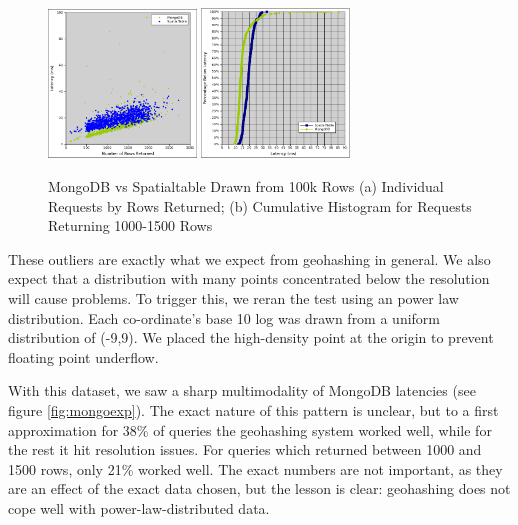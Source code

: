 \documentclass[11pt]{article}
\begin{document}
\begin{figure}[h]
\includegraphics[width=1.55in]{st_mongo}
\includegraphics[width=1.55in]{st_mongo_cumu}
\caption{MongoDB vs Spatialtable Drawn from 100k Rows (a) Individual Requests by Rows Returned; (b) Cumulative Histogram for Requests Returning 1000-1500 Rows }
\label{fig:mongo}
\end{figure}

These outliers are exactly what we expect from geohashing in general.  We also expect that a distribution with many points concentrated below the resolution will cause problems.  To trigger this, we reran the test using an power law distribution.  Each co-ordinate's base 10 log was drawn from a uniform distribution of (-9,9).  We placed the high-density point at the origin to prevent floating point underflow.

With this dataset, we saw a sharp multimodality of MongoDB latencies (see figure \ref{fig:mongoexp}).  The exact nature of this pattern is unclear, but to a first approximation for 38\% of queries the geohashing system worked well, while for the rest it hit resolution issues.  For queries which returned between 1000 and 1500 rows, only 21\% worked well.  The exact numbers are not important, as they are an effect of the exact data chosen, but the lesson is clear: geohashing does not cope well with power-law-distributed data.
\end{document}
